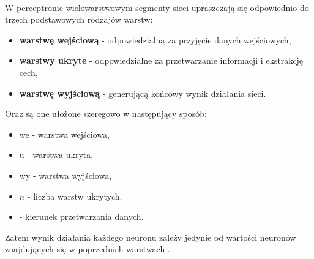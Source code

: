 \noindent\\
W perceptronie wielowarstwowym
segmenty sieci upraszczają się odpowiednio
do trzech podstawowych rodzajów warstw:
\begin{itemize}
  \item \textbf{warstwę wejściową} -
    odpowiedzialną za przyjęcie danych wejściowych,
  \item \textbf{warstwy ukryte} -
    odpowiedzialne za przetwarzanie informacji
    i ekstrakcję cech,
  \item \textbf{warstwę wyjściową} -
    generującą końcowy wynik działania sieci.
\end{itemize}
Oraz są one ułożone szeregowo w następujący sposób:\\
\begin{itemize}
  \item we - warstwa wejściowa,
  \item u - warstwa ukryta,
  \item wy - warstwa wyjściowa,
  \item $n$ - liczba warstw ukrytych.
  \item {} -
    kierunek przetwarzania danych.
\end{itemize}
Zatem wynik działania
każdego neuronu zależy jedynie
od wartości neuronów znajdujących się
w poprzednich warstwach%
.

